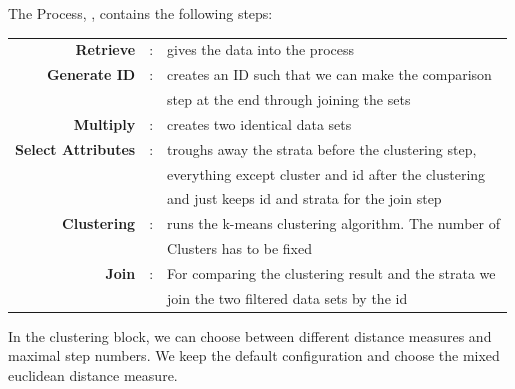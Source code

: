 	The Process, , contains the following steps:\\

	\begin{tabular}{r c l}
		\textbf{Retrieve} & : &  gives the data into the process \\
		\textbf{Generate ID} & : & creates an ID such that we can make the comparison\\
		 & & step at the end through joining the sets\\
		\textbf{Multiply} & : & creates two identical data sets\\
		\textbf{Select Attributes} & : &  troughs away the strata before the clustering step,\\
		& & everything except cluster and id after the clustering \\
		& & and just keeps id and strata for the join step\\
		\textbf{Clustering} & : &  runs the k-means clustering algorithm. The number of \\
		& & Clusters has to be fixed \\
		\textbf{Join} & : & For comparing the clustering result and the strata we \\
		& & join the two filtered data sets by the id \\
	\end{tabular}
	
	In the clustering block, we can choose between different distance measures and maximal step numbers. We keep the default configuration and choose the mixed euclidean distance measure.
\vspace*{-1em}
